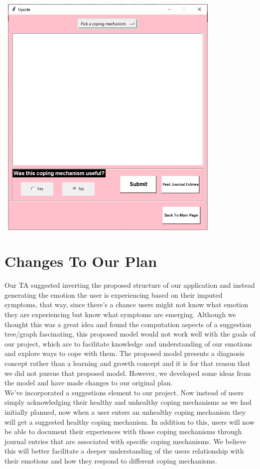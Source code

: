 \documentclass{article}
\begin{document}
    \begin{center}
        \includegraphics[width=11cm,height=12cm]{Images/journal.png}
    \end{center}


    \section{Changes To Our Plan}

    Our TA suggested inverting the proposed structure of our application and instead generating the emotion the user is experiencing based on their imputed symptoms, that way, since there’s a chance users might not know what emotion they are experiencing but know what symptoms are emerging. Although we thought this was a great idea and found the computation aspects of a suggestion tree/graph fascinating, this proposed model would not work well with the goals of our project, which are to facilitate knowledge and understanding of our emotions and explore ways to cope with them. The proposed model presents a diagnosis concept rather than a learning and growth concept and it is for that reason that we did not pursue that proposed model. However, we developed some ideas from the model and have made changes to our original plan.\\

    We’ve incorporated a suggestions element to our project. Now instead of users simply acknowledging their healthy and unhealthy coping mechanisms as we had initially planned, now when a user enters an unhealthy coping mechanism they will get a suggested healthy coping mechanism. In addition to this, users will now be able to document their experiences with those coping mechanisms through journal entries that are associated with specific coping mechanisms. We believe this will better facilitate a deeper understanding of the users relationship with their emotions and how they respond to different coping mechanisms. \\
\end{document}
